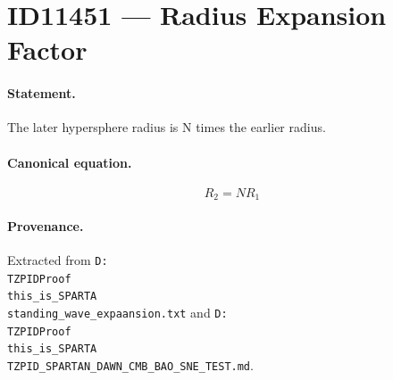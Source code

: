 \section*{ID11451 --- Radius Expansion Factor}

\paragraph{Statement.}
The later hypersphere radius is N times the earlier radius.

\paragraph{Canonical equation.}
\[
R_2=NR_1
\]

\paragraph{Provenance.}
Extracted from \texttt{D:\\TZPIDProof\\this\_is\_SPARTA\\standing\_wave\_expaansion.txt} and \texttt{D:\\TZPIDProof\\this\_is\_SPARTA\\TZPID\_SPARTAN\_DAWN\_CMB\_BAO\_SNE\_TEST.md}.
